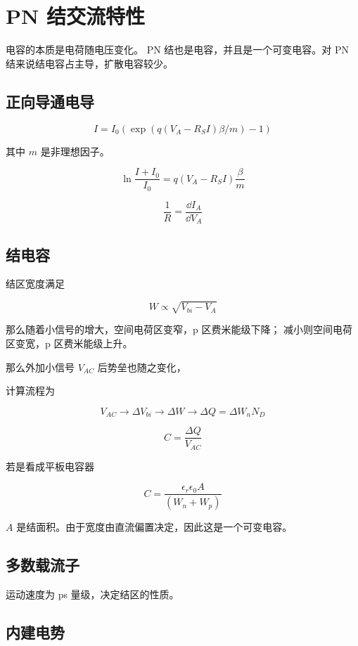 \documentclass[cn,11pt,chinese,black,simple]{../elegantbook}
\begin{document}
\fi 
\def\chapname{02pnjvi}

\chapter{PN 结交流特性}

电容的本质是电荷随电压变化。 PN 结也是电容，并且是一个可变电容。对 PN 结来说结电容占主导，扩散电容较少。

\section{正向导通电导}

\[I = I_0 (\exp(q(V_A-R_S I)\beta / m) - 1) \]

其中 \(m\) 是非理想因子。

\[\ln \frac{I+I_0}{I_0} = q(V_A - R_S I) \frac{\beta}{m}\]

\[\frac{1}{R} = \frac{\dd{I_A}}{\dd{V_A}}\]

\section{结电容}

结区宽度满足

\[W \propto \sqrt{V_{bi} - V_A}\]

那么随着小信号的增大，空间电荷区变窄，p 区费米能级下降；
减小则空间电荷区变宽，p 区费米能级上升。

那么外加小信号 \(V_{AC}\) 后势垒也随之变化，


计算流程为

\[V_{AC} \rightarrow \Delta V_{bi} \rightarrow \Delta W \rightarrow \Delta Q = \Delta W_n N_D\]

\[C = \frac{\Delta Q}{V_{AC}}\]

若是看成平板电容器

\[C = \frac{\epsilon_r \epsilon_0 A}{(W_n + W_p)}\] 

\(A\) 是结面积。由于宽度由直流偏置决定，因此这是一个可变电容。


\section{多数载流子}

运动速度为 ps 量级，决定结区的性质。

\section{内建电势}
\end{document}
